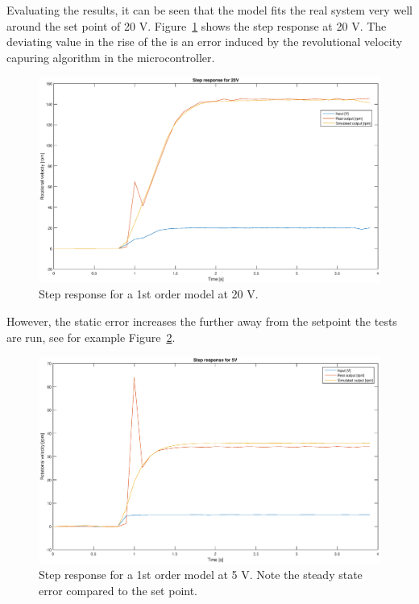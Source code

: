 Evaluating the results, it can be seen that the model fits the real system very
well around the set point of 20 V. Figure~\ref{fig:1storder_20} shows the step
response at 20 V. The deviating value in the rise of the is an error induced by
the revolutional velocity capuring algorithm in the microcontroller.
\begin{figure}[H]
    \label{fig:1storder_20}
    \centering
    \includegraphics[width=\textwidth]{./img/testrig_20Vstep_no_i_no_fric.eps}
    \caption{Step response for a 1st order model at 20 V.}
\end{figure}
However, the static error increases the further away from the setpoint the tests
are run, see for example Figure~\ref{fig:1storder_5}.
\begin{figure}[H]
    \label{fig:1storder_5}
    \centering
    \includegraphics[width=\textwidth]{./img/testrig_5Vstep_no_i_no_fric.eps}
    \caption{Step response for a 1st order model at 5 V. Note the steady state
    error compared to the set point.}
\end{figure}
